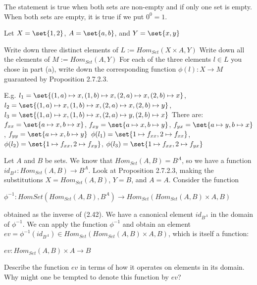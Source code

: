 \documentclass{article}
\begin{document}
\ans

The statement is true when both sets are non-empty and if only one set is empty.
When both sets are empty, it is true if we put $0^0 = 1$.


Let $X = \set{1, 2}$, $A = \set{a, b}$, and $Y = \set{x, y}$

\es Write down three distinct elements of $L := Hom_{Set}(X \times A, Y)$
\ei Write down all the elements of $M := Hom_{Set}(A, Y)$
\ei For each of the three elements $l \in L$ you chose in part (a), write down
    the corresponding function $\phi(l): X \to M$ guaranteed by Proposition
    2.7.2.3.
\ee

\ans

\es E.g.
    $l_1 = \set{(1,a) \mapsto x, (1,b) \mapsto x, (2,a) \mapsto x, (2,b) \mapsto x}$,
    $l_2 = \set{(1,a) \mapsto x, (1,b) \mapsto x, (2,a) \mapsto x, (2,b) \mapsto y}$,
    $l_3 = \set{(1,a) \mapsto x, (1,b) \mapsto x, (2,a) \mapsto y, (2,b) \mapsto x}$
\ei There are:
    $f_{xx} = \set{a \mapsto x, b \mapsto x}$,
    $f_{xy} = \set{a \mapsto x, b \mapsto y}$,
    $f_{yx} = \set{a \mapsto y, b \mapsto x}$,
    $f_{yy} = \set{a \mapsto x, b \mapsto y}$
\ei $\phi(l_1) = \set{1 \mapsto f_{xx}, 2 \mapsto f_{xx}}$,
    $\phi(l_2) = \set{1 \mapsto f_{xx}, 2 \mapsto f_{xy}}$,
    $\phi(l_3) = \set{1 \mapsto f_{xx}, 2 \mapsto f_{yx}}$
\ee


Let $A$ and $B$ be sets.  We know that $Hom_{Set}(A, B) = B^A$, so we have a
function $id_{B^A} : Hom_{Set}(A, B) \to B^A$. Look at Proposition 2.7.2.3,
making the substitutions $X = Hom_{Set}(A, B)$, $Y = B$, and $A = A$. Consider
the function

\vsp

$\phi^{-1} : Hom{Set}(Hom_{Set}(A, B), B^A) \to Hom_{Set}(Hom_{Set}(A, B) \times A, B)$

\vsp

obtained as the inverse of (2.42).  We have a canonical element $id_{B^A}$ in
the domain of $\phi^{-1}$.  We can apply the function $\phi^{-1}$ and obtain an
element $ev = \phi^{-1}(id_{B^A}) \in Hom_{Set}(Hom_{Set}(A, B) \times A, B)$,
which is itself a function:

\vsp
$ev: Hom_{Set}(A, B) \times A \to B$
\vsp

\es Describe the function $ev$ in terms of how it operates on elements in its domain.
\ei Why might one be tempted to denote this function by $ev$?
\ee
\end{document}

